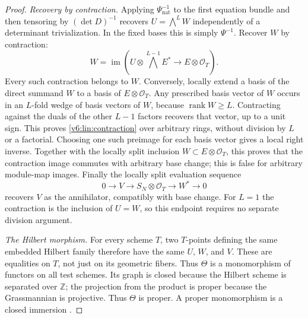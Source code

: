 \documentclass[10pt,fleqn]{article}
\numberwithin{equation}{section}
\begin{document}
\begin{proof}
\emph{Recovery by contraction.} Applying $\Psi_{\mathrm{nat}}^{-1}$ to the
first equation bundle and then tensoring by $(\det D)^{-1}$ recovers
$U=\bigwedge^L W$ independently of a determinant trivialization.
In the fixed bases this is simply $\Psi^{-1}$.  Recover $W$ by contraction:
\begin{equation}\label{v6:lin:contraction}
 W=\operatorname{im}\left(
 U\otimes\bigwedge^{L-1}E^*
 \longrightarrow E\otimes\mathcal O_T\right).
\end{equation}
Every such contraction belongs to $W$.  Conversely, locally extend
a basis of the direct summand $W$ to a basis of $E\otimes\mathcal O_T$.
Any prescribed basis vector of $W$ occurs in an $L$-fold wedge of
basis vectors of $W$, because $\operatorname{rank}W\ge L$.
Contracting against the duals of the other $L-1$ factors recovers
that vector, up to a unit sign.  This proves
\eqref{v6:lin:contraction} over arbitrary rings, without division by
$L$ or a factorial.  Choosing one such preimage for each basis vector
gives a local right inverse.  Together with the locally split inclusion
$W\subset E\otimes\mathcal O_T$, this proves that the contraction
image commutes with arbitrary base change; this is false for arbitrary
module-map images.  Finally the locally split evaluation sequence
\[
 0\longrightarrow V\longrightarrow S_N\otimes\mathcal O_T
 \longrightarrow W^*\longrightarrow0
\]
recovers $V$ as the annihilator, compatibly with base change.
For $L=1$ the contraction is the inclusion of $U=W$, so this endpoint
requires no separate division argument.

\emph{The Hilbert morphism.} For every scheme $T$, two $T$-points defining the same embedded
Hilbert family therefore have the same $U$, $W$, and $V$.
These are equalities on $T$, not just on its geometric fibers.
Thus $\Theta$ is a monomorphism of functors on all test schemes.
Its graph is closed because the Hilbert scheme is
separated over $\mathbb Z$; the projection from the product is proper
because the Grassmannian is projective.  Thus $\Theta$ is proper.
A proper monomorphism is a closed immersion
\cite[Tag~04XV]{Stacks}.
\end{proof}
\end{document}
